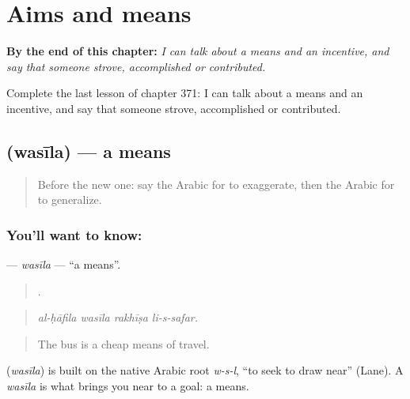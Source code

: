 
\chapter{Aims and means}
\label{ch:ar-aims-and-means}

\begin{chapteropening}
\textbf{By the end of this chapter:} \emph{I can talk about a means and an incentive, and say that someone strove, accomplished or contributed.}

Complete the last lesson of chapter 371: I can talk about a means and an incentive, and say that someone strove, accomplished or contributed.
\end{chapteropening}

\section[\texorpdfstring{\ar{وسيلة} (wasīla)}{وسيلة (wasīla)}]{ (wasīla) — a means}

\label{lesson:AR-C371-wasila}



\begin{quote}
Before the new one: say the Arabic for to exaggerate, then the Arabic for to generalize.
\end{quote}

\subsection*{You'll want to know: }
\textbf{} — \emph{wasīla} — \textquotedblleft{}a means\textquotedblright{}.

\begin{quote}
   .
\end{quote}

\begin{quote}
\emph{al-ḥāfila wasīla rakhīṣa li-s-safar.}
\end{quote}

\begin{quote}
The bus is a cheap means of travel.
\end{quote}

\begin{cousinweb}
\textbf{} (\emph{wasīla}) is built on the native Arabic root \emph{w-s-l}, \textquotedblleft{}to seek to draw near\textquotedblright{} (Lane). A \emph{wasīla} is what brings you near to a goal: a means.
\end{cousinweb}


